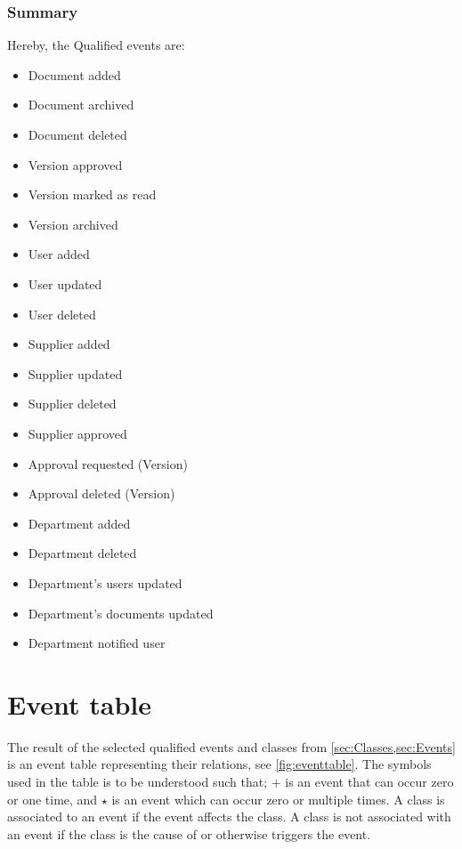 \subsubsection*{Summary}
Hereby, the Qualified events are:
\begin{multicols}{2}
	\begin{itemize}
	\item Document added
	\item Document archived
	\item Document deleted
	\item Version approved
	\item Version marked as read
	\item Version archived
	\item User added
	\item User updated
	\item User deleted
	\item Supplier added
	\item Supplier updated
	\item Supplier deleted
	\item Supplier approved
	\item Approval requested (Version)
	\item Approval deleted (Version)
	\item Department added
	\item Department deleted
	\item Department's users updated
	\item Department's documents updated
	\item Department notified user
	\end{itemize}
\end{multicols}

\section{Event table}\label{sec:EventTable}
The result of the selected qualified events and classes from \cref{sec:Classes,sec:Events} is an event table representing their relations, see \cref{fig:eventtable}.
The symbols used in the table is to be understood such that; $+$ is an event that can occur zero or one time, and $\star$ is an event which can occur zero or multiple times.
A class is associated to an event if the event affects the class.
A class is not associated with an event if the class is the cause of or otherwise triggers the event.

